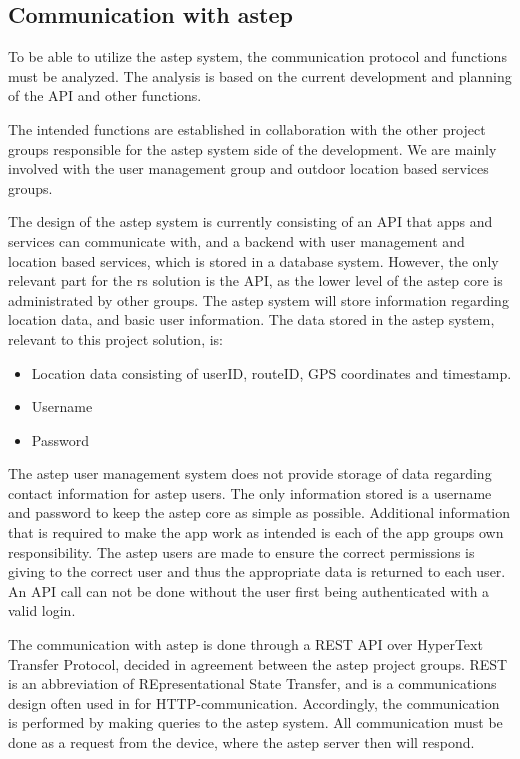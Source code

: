 \subsection{Communication with \gls{astep}}\label{ssec:communicationwithastep}
To be able to utilize the \gls{astep} system, the communication protocol and functions must be analyzed. 
The analysis is based on the current development and planning of the API and other functions.

The intended functions are established in collaboration with the other project groups responsible for the \gls{astep} system side of the development. 
We are mainly involved with the user management group and outdoor location based services groups.

The design of the \gls{astep} system is currently consisting of an API that apps and services can communicate with, and a backend with user management and location based services, which is stored in a database system.
However, the only relevant part for the \gls{rs} solution is the API, as the lower level of the \gls{astep} core is administrated by other groups.
The \gls{astep} system will store information regarding location data, and basic user information. 
The data stored in the \gls{astep} system, relevant to this project solution, is:
\begin{itemize}
	\item Location data consisting of userID, routeID, GPS coordinates and timestamp.
	\item Username
	\item Password
\end{itemize}

The \gls{astep} user management system does not provide storage of data regarding contact information for \gls{astep} users.
The only information stored is a username and password to keep the \gls{astep} core as simple as possible.
Additional information that is required to make the app work as intended is each of the app groups own responsibility.
The \gls{astep} users are made to ensure the correct permissions is giving to the correct user and thus the appropriate data is returned to each user.
An API call can not be done without the user first being authenticated with a valid login.

The communication with \gls{astep} is done through a REST API over HyperText Transfer Protocol, decided in agreement between the \gls{astep} project groups.
REST is an abbreviation of REpresentational State Transfer, and is a communications design often used in for HTTP-communication\cite{REST}.
Accordingly, the communication is performed by making queries to the \gls{astep} system. 
All communication must be done as a request from the device, where the \gls{astep} server then will respond.


